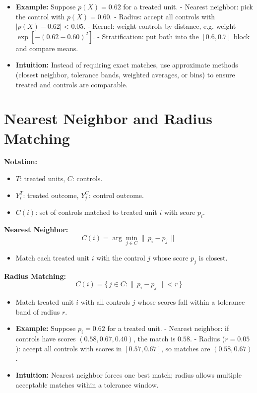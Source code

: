\documentclass[12pt]{article}
\begin{document}
\begin{itemize}
    \item \textbf{Example:} Suppose $p(X)=0.62$ for a treated unit.  
      - Nearest neighbor: pick the control with $p(X)=0.60$.  
      - Radius: accept all controls with $|p(X)-0.62|<0.05$.  
      - Kernel: weight controls by distance, e.g. weight $\exp[-(0.62-0.60)^2]$.  
      - Stratification: put both into the $[0.6,0.7]$ block and compare means.  
    \item \textbf{Intuition:} Instead of requiring exact matches, use approximate methods (closest neighbor, tolerance bands, weighted averages, or bins) to ensure treated and controls are comparable.
\end{itemize}

\section*{\noindent\textbf{Nearest Neighbor and Radius Matching}}

\textbf{Notation:}  
\begin{itemize}
    \item $T$: treated units, $C$: controls.
    \item $Y_i^T$: treated outcome, $Y_j^C$: control outcome.
    \item $C(i)$: set of controls matched to treated unit $i$ with score $p_i$.
\end{itemize}

\textbf{Nearest Neighbor:}
\[
C(i) = \arg\min_{j \in C} \|\,p_i - p_j\,\|
\]
\begin{itemize}
    \item Match each treated unit $i$ with the control $j$ whose score $p_j$ is closest.
\end{itemize}

\textbf{Radius Matching:}
\[
C(i) = \{\, j \in C : \|\,p_i - p_j\,\| < r \,\}
\]
\begin{itemize}
    \item Match treated unit $i$ with all controls $j$ whose scores fall within a tolerance band of radius $r$.
\end{itemize}

\begin{itemize}
    \item \textbf{Example:} Suppose $p_i=0.62$ for a treated unit.  
      - Nearest neighbor: if controls have scores $(0.58, 0.67, 0.40)$, the match is $0.58$.  
      - Radius ($r=0.05$): accept all controls with scores in $[0.57,0.67]$, so matches are $(0.58,0.67)$.  
    \item \textbf{Intuition:} Nearest neighbor forces one best match; radius allows multiple acceptable matches within a tolerance window.  
\end{itemize}
\end{document}
